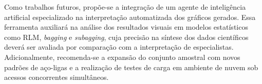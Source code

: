 Como trabalhos futuros, propõe-se a integração de um agente de inteligência artificial especializado na interpretação automatizada dos gráficos gerados. Essa ferramenta auxiliará na análise dos resultados visuais em modelos estatísticos como RLM, \textit{bagging} e \textit{subagging}, cuja precisão na síntese dos dados científicos deverá ser avaliada por comparação com a interpretação de especialistas. Adicionalmente, recomenda-se a expansão do conjunto amostral com novos padrões de aço-ligas e a realização de testes de carga em ambiente de nuvem sob acessos concorrentes simultâneos.